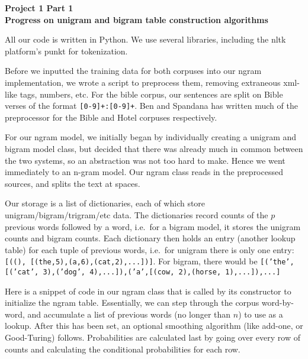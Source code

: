 \documentclass{article}
\begin{document}
\begin{center}\textbf{Project 1 Part 1\\Progress on unigram and bigram table construction algorithms}\end{center}

All our code is written in Python. We use several libraries, including the nltk platform's punkt for tokenization.\par

Before we inputted the training data for both corpuses into our ngram implementation, we wrote a script to preprocess them, removing extraneous xml-like tags, numbers, etc. For the bible corpus, our sentences are split on Bible verses of the format \texttt{[0-9]+:[0-9]+}. Ben and Spandana has written much of the preprocessor for the Bible and Hotel corpuses respectively.\par

For our ngram model, we initially began by individually creating a unigram and bigram model class, but decided that there was already much in common between the two systems, so an abstraction was not too hard to make. Hence we went immediately to an n-gram model. Our ngram class reads in the preprocessed sources, and splits the text at spaces.\par

Our storage is a list of dictionaries, each of which store unigram/bigram/trigram/etc data. The dictionaries record counts of the $p$ previous words followed by a word, i.e.\ for a bigram model, it stores the unigram counts and bigram counts. Each dictionary then holds an entry (another lookup table) for each tuple of previous words, i.e.\ for unigram there is only one entry: \texttt{[((), [(the,5),(a,6),(cat,2),...])]}. For bigram, there would be \texttt{[('the',[('cat', 3),('dog', 4),...]),('a',[(cow, 2),(horse, 1),...]),...]}\par

Here is a snippet of code in our ngram class that is called by its constructor to initialize the ngram table. Essentially, we can step through the corpus word-by-word, and accumulate a list of previous words (no longer than $n$) to use as a lookup. After this has been set, an optional smoothing algorithm (like add-one, or Good-Turing) follows. Probabilities are calculated last by going over every row of counts and calculating the conditional probabilities for each row.
\end{document}
